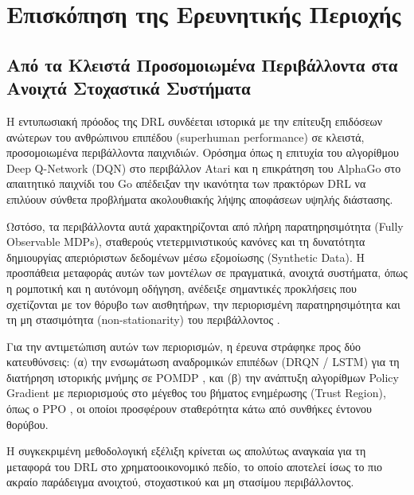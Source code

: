 
\chapter{Επισκόπηση της Ερευνητικής Περιοχής}

\section{Από τα Κλειστά Προσομοιωμένα Περιβάλλοντα στα Ανοιχτά Στοχαστικά Συστήματα}
Η εντυπωσιακή πρόοδος της DRL συνδέεται ιστορικά με την επίτευξη επιδόσεων ανώτερων του 
ανθρώπινου επιπέδου (superhuman performance) σε κλειστά, προσομοιωμένα περιβάλλοντα παιχνιδιών. 
Ορόσημα όπως η επιτυχία του αλγορίθμου Deep Q-Network (DQN) στο περιβάλλον Atari \cite{mnih2015dqn}
 και η επικράτηση του AlphaGo στο απαιτητικό παιχνίδι του Go \cite{silver2016alphago} απέδειξαν 
 την ικανότητα των πρακτόρων DRL να επιλύουν σύνθετα προβλήματα ακολουθιακής λήψης αποφάσεων υψηλής 
 διάστασης.

Ωστόσο, τα περιβάλλοντα αυτά χαρακτηρίζονται από πλήρη παρατηρησιμότητα (Fully Observable MDPs), 
σταθερούς ντετερμινιστικούς κανόνες και τη δυνατότητα δημιουργίας απεριόριστων δεδομένων μέσω 
εξομοίωσης (Synthetic Data). Η προσπάθεια μεταφοράς αυτών των μοντέλων σε πραγματικά, ανοιχτά 
συστήματα, όπως η ρομποτική και η αυτόνομη οδήγηση, ανέδειξε σημαντικές προκλήσεις που σχετίζονται 
με τον θόρυβο των αισθητήρων, την περιορισμένη παρατηρησιμότητα και τη μη στασιμότητα 
(non-stationarity) του περιβάλλοντος \cite{kober2013robotics}. 

Για την αντιμετώπιση αυτών των περιορισμών, η έρευνα στράφηκε προς δύο κατευθύνσεις: 
(α) την ενσωμάτωση αναδρομικών επιπέδων (DRQN / LSTM) για τη διατήρηση ιστορικής μνήμης σε POMDP \cite{hausknecht2015drqn},
και (β) την ανάπτυξη αλγορίθμων Policy Gradient με περιορισμούς στο μέγεθος του βήματος ενημέρωσης 
(Trust Region), όπως ο PPO \cite{schulman2017ppo}, οι οποίοι προσφέρουν σταθερότητα κάτω 
από συνθήκες έντονου θορύβου. 

Η συγκεκριμένη μεθοδολογική εξέλιξη κρίνεται ως απολύτως αναγκαία για τη μεταφορά του 
DRL στο χρηματοοικονομικό πεδίο, το οποίο αποτελεί ίσως το πιο ακραίο παράδειγμα ανοιχτού, 
στοχαστικού και μη στασίμου περιβάλλοντος.

